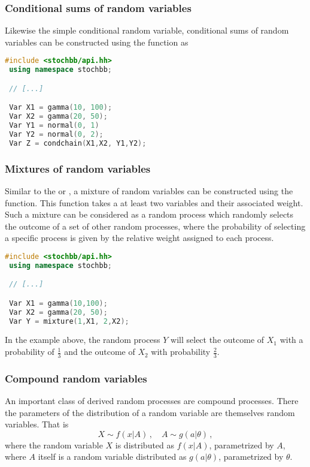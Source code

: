 \subsubsection{Conditional sums of random variables}
Likewise the simple conditional random variable, conditional sums of random variables can be constructed 
using the  function as 
\begin{lstlisting}[language=C++]
 #include <stochbb/api.hh>
 using namespace stochbb;

 // [...]

 Var X1 = gamma(10, 100);
 Var X2 = gamma(20, 50);
 Var Y1 = normal(0, 1)
 Var Y2 = normal(0, 2);
 Var Z = condchain(X1,X2, Y1,Y2);
\end{lstlisting}

\subsubsection{Mixtures of random variables}
Similar to the  or , a mixture of random variables can be
constructed using the  function. This function takes a at least 
two variables and their associated weight. Such a mixture can be considered as a random process which
randomly selects the outcome of a set of other random processes, where the probability of
selecting a specific process is given by the relative weight assigned to each process.
\begin{lstlisting}[language=C++]
 #include <stochbb/api.hh>
 using namespace stochbb;

 // [...]

 Var X1 = gamma(10,100);
 Var X2 = gamma(20, 50);
 Var Y = mixture(1,X1, 2,X2);
\end{lstlisting}

In the example above, the random process $Y$ will select the outcome of $X_1$ with
a probability of $\frac{1}{3}$ and the outcome of $X_2$ with probability
$\frac{2}{3}$.

\subsubsection{Compound random variables}
An important class of derived random processes are compound processes. There the parameters of the
distribution of a random variable are themselves random variables. That is
\begin{equation}
 X \sim f(x|A)\,,\quad A \sim g(a|\theta)\,, \nonumber
\end{equation}
where the random variable $X$ is distributed as $f(x|A)$, parametrized by $A$,
where $A$ itself is a random variable distributed as $g(a|\theta)$, parametrized by
$\theta$. 

